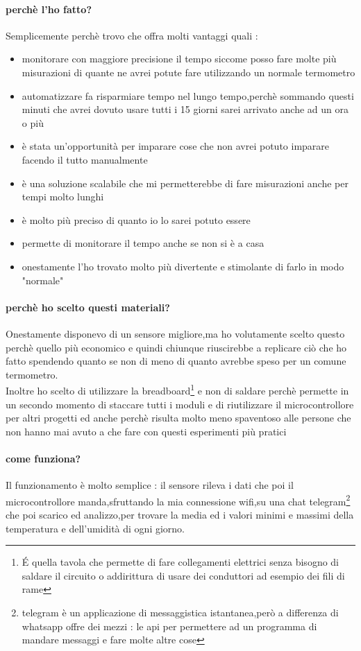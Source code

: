 \documentclass[12pt]{article}
\begin{document}
\paragraph{perchè l'ho fatto?} 
Semplicemente perchè trovo che offra molti vantaggi quali :
\begin{itemize}
    \item monitorare con maggiore precisione il tempo siccome posso fare molte più misurazioni di quante ne avrei potute fare utilizzando un normale termometro
    \item automatizzare fa risparmiare tempo nel lungo tempo,perchè sommando questi minuti che avrei dovuto usare tutti i 15 giorni sarei arrivato anche ad un ora o più
    \item è stata un'opportunità per imparare cose che non avrei potuto imparare facendo il tutto manualmente
    \item è una soluzione scalabile che mi permetterebbe di fare misurazioni anche per tempi molto lunghi
    \item è molto più preciso di quanto io lo sarei potuto essere
    \item permette di monitorare il tempo anche se non si è a casa
    \item onestamente l'ho trovato molto più divertente e stimolante di farlo in modo "normale"
\end{itemize}
\paragraph{perchè ho scelto questi materiali?} 
Onestamente disponevo di un sensore migliore,ma ho volutamente scelto questo perchè quello più economico e quindi chiunque riuscirebbe a replicare ciò che ho fatto spendendo quanto se non di meno di quanto avrebbe speso per un comune termometro.\\
Inoltre ho scelto di utilizzare la breadboard\footnote{É quella tavola che permette di fare collegamenti elettrici senza bisogno di saldare il circuito o addirittura di usare dei conduttori ad esempio dei fili di rame} e non di saldare perchè permette in un secondo momento di staccare tutti i moduli e di riutilizzare il microcontrollore per altri progetti ed anche perchè risulta molto meno spaventoso alle persone che non hanno mai avuto a che fare con questi esperimenti più pratici
\paragraph{come funziona?}
Il funzionamento è molto semplice :  il sensore rileva i dati che poi il microcontrollore manda,sfruttando la mia connessione wifi,su una chat telegram\footnote{telegram è un applicazione di messaggistica istantanea,però a differenza di whatsapp offre dei mezzi : le api per permettere ad un programma di mandare messaggi e fare molte altre cose} che poi scarico ed analizzo,per trovare la media ed i valori minimi e massimi della temperatura e dell'umidità di ogni giorno.
\end{document}
